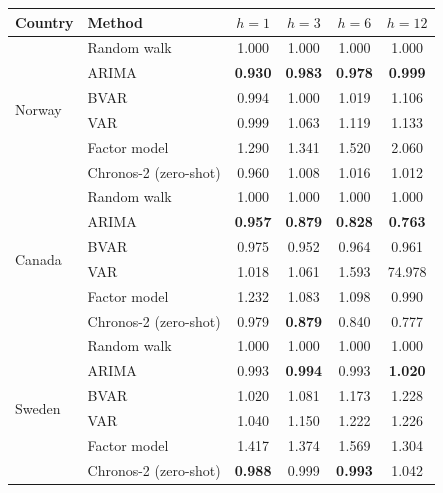 \begin{tabular}{llcccc}
\toprule
Country & Method & $h{=}1$ & $h{=}3$ & $h{=}6$ & $h{=}12$ \\
\midrule
\multirow{6}{*}{Norway} & Random walk & 1.000 & 1.000 & 1.000 & 1.000 \\
 & ARIMA & \textbf{0.930} & \textbf{0.983} & \textbf{0.978} & \textbf{0.999} \\
 & BVAR & 0.994 & 1.000 & 1.019 & 1.106 \\
 & VAR & 0.999 & 1.063 & 1.119 & 1.133 \\
 & Factor model & 1.290 & 1.341 & 1.520 & 2.060 \\
 & Chronos-2 (zero-shot) & 0.960 & 1.008 & 1.016 & 1.012 \\
\midrule
\multirow{6}{*}{Canada} & Random walk & 1.000 & 1.000 & 1.000 & 1.000 \\
 & ARIMA & \textbf{0.957} & \textbf{0.879} & \textbf{0.828} & \textbf{0.763} \\
 & BVAR & 0.975 & 0.952 & 0.964 & 0.961 \\
 & VAR & 1.018 & 1.061 & 1.593 & 74.978 \\
 & Factor model & 1.232 & 1.083 & 1.098 & 0.990 \\
 & Chronos-2 (zero-shot) & 0.979 & \textbf{0.879} & 0.840 & 0.777 \\
\midrule
\multirow{6}{*}{Sweden} & Random walk & 1.000 & 1.000 & 1.000 & 1.000 \\
 & ARIMA & 0.993 & \textbf{0.994} & 0.993 & \textbf{1.020} \\
 & BVAR & 1.020 & 1.081 & 1.173 & 1.228 \\
 & VAR & 1.040 & 1.150 & 1.222 & 1.226 \\
 & Factor model & 1.417 & 1.374 & 1.569 & 1.304 \\
 & Chronos-2 (zero-shot) & \textbf{0.988} & 0.999 & \textbf{0.993} & 1.042 \\
\bottomrule
\end{tabular}
